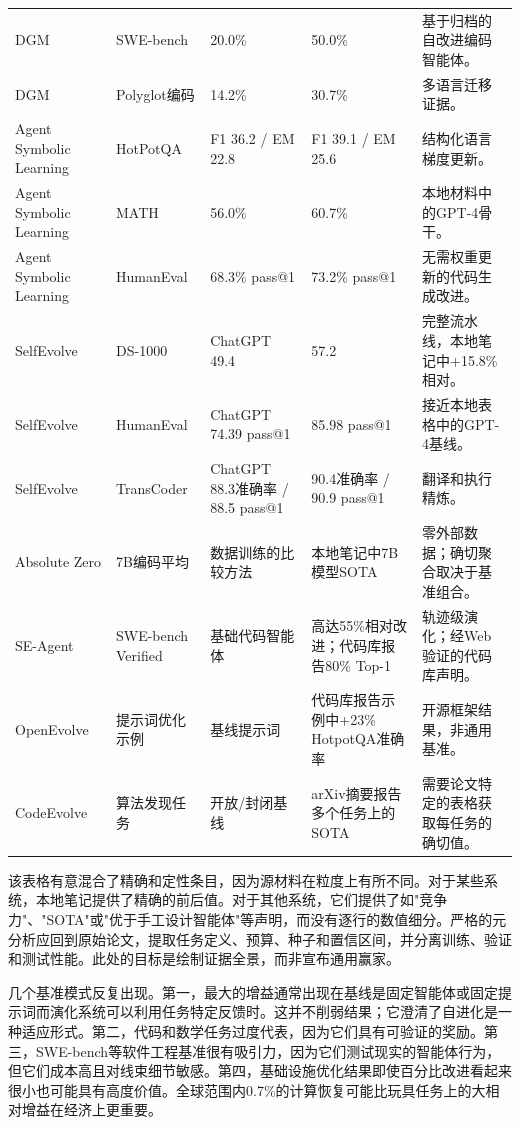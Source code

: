 {\begin{longtable}{@{}L{0.13\textwidth}L{0.18\textwidth}L{0.17\textwidth}L{0.18\textwidth}L{0.28\textwidth}@{}}
DGM & SWE-bench & 20.0\% & 50.0\% & 基于归档的自改进编码智能体。 \\
DGM & Polyglot编码 & 14.2\% & 30.7\% & 多语言迁移证据。 \\
Agent Symbolic Learning & HotPotQA & F1 36.2 / EM 22.8 & F1 39.1 / EM 25.6 & 结构化语言梯度更新。 \\
Agent Symbolic Learning & MATH & 56.0\% & 60.7\% & 本地材料中的GPT-4骨干。 \\
Agent Symbolic Learning & HumanEval & 68.3\% pass@1 & 73.2\% pass@1 & 无需权重更新的代码生成改进。 \\
SelfEvolve & DS-1000 & ChatGPT 49.4 & 57.2 & 完整流水线，本地笔记中+15.8\%相对。 \\
SelfEvolve & HumanEval & ChatGPT 74.39 pass@1 & 85.98 pass@1 & 接近本地表格中的GPT-4基线。 \\
SelfEvolve & TransCoder & ChatGPT 88.3准确率 / 88.5 pass@1 & 90.4准确率 / 90.9 pass@1 & 翻译和执行精炼。 \\
Absolute Zero & 7B编码平均 & 数据训练的比较方法 & 本地笔记中7B模型SOTA & 零外部数据；确切聚合取决于基准组合。 \\
SE-Agent & SWE-bench Verified & 基础代码智能体 & 高达55\%相对改进；代码库报告80\% Top-1 & 轨迹级演化；经Web验证的代码库声明。 \\
OpenEvolve & 提示词优化示例 & 基线提示词 & 代码库报告示例中+23\% HotpotQA准确率 & 开源框架结果，非通用基准。 \\
CodeEvolve & 算法发现任务 & 开放/封闭基线 & arXiv摘要报告多个任务上的SOTA & 需要论文特定的表格获取每任务的确切值。 \\
\end{longtable}}

该表格有意混合了精确和定性条目，因为源材料在粒度上有所不同。对于某些系统，本地笔记提供了精确的前后值。对于其他系统，它们提供了如"竞争力"、"SOTA"或"优于手工设计智能体"等声明，而没有逐行的数值细分。严格的元分析应回到原始论文，提取任务定义、预算、种子和置信区间，并分离训练、验证和测试性能。此处的目标是绘制证据全景，而非宣布通用赢家。

几个基准模式反复出现。第一，最大的增益通常出现在基线是固定智能体或固定提示词而演化系统可以利用任务特定反馈时。这并不削弱结果；它澄清了自进化是一种适应形式。第二，代码和数学任务过度代表，因为它们具有可验证的奖励。第三，SWE-bench等软件工程基准很有吸引力，因为它们测试现实的智能体行为，但它们成本高且对线束细节敏感。第四，基础设施优化结果即使百分比改进看起来很小也可能具有高度价值。全球范围内0.7\%的计算恢复可能比玩具任务上的大相对增益在经济上更重要。

